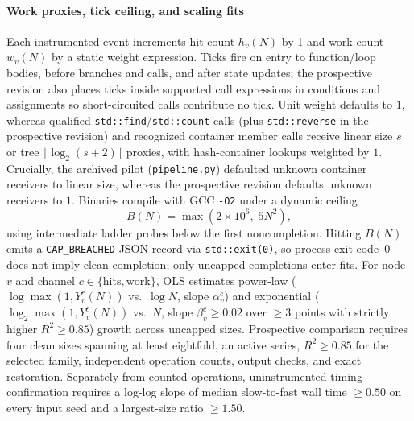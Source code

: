 \paragraph{Work proxies, tick ceiling, and scaling fits}
Each instrumented event increments hit count $h_v(N)$ by 1 and work count $w_v(N)$ by a static weight expression. Ticks fire on entry to function/loop bodies, before branches and calls, and after state updates; the prospective revision also places ticks inside supported call expressions in conditions and assignments so short-circuited calls contribute no tick. Unit weight defaults to $1$, whereas qualified \texttt{std::find}/\texttt{std::count} calls (plus \texttt{std::reverse} in the prospective revision) and recognized container member calls receive linear size $s$ or tree $\lfloor\log_2(s+2)\rfloor$ proxies, with hash-container lookups weighted by $1$. Crucially, the archived pilot (\texttt{pipeline.py}) defaulted unknown container receivers to linear size, whereas the prospective revision defaults unknown receivers to $1$. Binaries compile with GCC \texttt{-O2} under a dynamic ceiling
\begin{equation}
B(N) = \max\!\left(2\times 10^6,\; 5N^2\right),
\end{equation}
using intermediate ladder probes below the first noncompletion. Hitting $B(N)$ emits a \texttt{CAP\_BREACHED} JSON record via \texttt{std::exit(0)}, so process exit code~$0$ does not imply clean completion; only uncapped completions enter fits. For node $v$ and channel $c \in \{\mathrm{hits},\mathrm{work}\}$, OLS estimates power-law ($\log\max(1,Y_v^c(N))$ vs.\ $\log N$, slope $\alpha_v^c$) and exponential ($\log_2\max(1,Y_v^c(N))$ vs.\ $N$, slope $\beta_v^c \ge 0.02$ over $\ge 3$ points with strictly higher $R^2 \ge 0.85$) growth across uncapped sizes. Prospective comparison requires four clean sizes spanning at least eightfold, an active series, $R^2 \ge 0.85$ for the selected family, independent operation counts, output checks, and exact restoration. Separately from counted operations, uninstrumented timing confirmation requires a log-log slope of median slow-to-fast wall time $\ge 0.50$ on every input seed and a largest-size ratio $\ge 1.50$.

